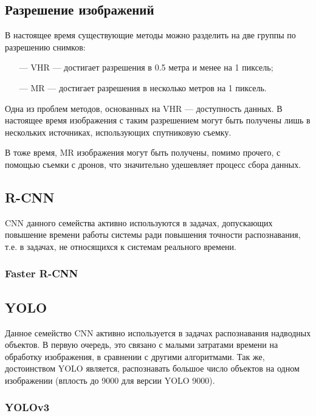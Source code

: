 \subsection{Разрешение изображений}

В настоящее время существующие методы можно разделить на две группы по разрешению снимков:

\begin{itemize}
    \item[---] VHR --- достигает разрешения в 0.5 метра и менее на 1 пиксель;
    \item[---] MR --- достигает разрешения в несколько метров на 1 пиксель.
\end{itemize}

Одна из проблем методов, основанных на VHR --- доступность данных. В настоящее время изображения с таким разрешением могут быть получены лишь в нескольких источниках, использующих спутниковую съемку.

В тоже время, MR изображения могут быть получены, помимо прочего, с помощью съемки с дронов, что значительно удешевляет процесс сбора данных.

\subsection{R-CNN}

CNN данного семейства активно используются в задачах, допускающих повышение времени работы системы ради повышения точности распознавания, т.е. в задачах, не относящихся к системам реального времени.

\subsubsection{Faster R-CNN}

\subsection{YOLO}

Данное семейство CNN активно используется в задачах распознавания надводных объектов. В первую очередь, это связано с малыми затратами времени на обработку изображения, в сравнении с другими алгоритмами. Так же, достоинством YOLO является, распознавать большое число объектов на одном изображении (вплость до 9000 для версии YOLO 9000).

\subsubsection{YOLOv3}

